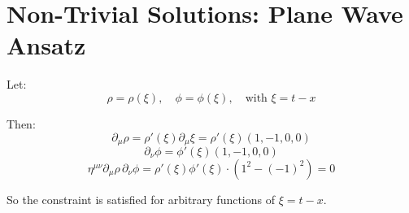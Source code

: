 \documentclass{article}
\begin{document}
\section*{Non-Trivial Solutions: Plane Wave Ansatz}

Let:
\[
\rho = \rho(\xi), \quad \phi = \phi(\xi), \quad \text{with } \xi = t - x
\]

Then:
\[
\partial_\mu \rho = \rho'(\xi) \partial_\mu \xi = \rho'(\xi)(1, -1, 0, 0)
\]
\[
\partial_\nu \phi = \phi'(\xi)(1, -1, 0, 0)
\]
\[
\eta^{\mu\nu} \partial_\mu \rho \, \partial_\nu \phi = \rho'(\xi) \phi'(\xi) \cdot (1^2 - (-1)^2) = 0
\]

So the constraint is satisfied for arbitrary functions of \( \xi = t - x \).
\end{document}
